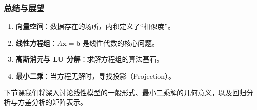 \begin{frame}
\frametitle{总结与展望}

\begin{enumerate}
    \item \textbf{向量空间}：数据存在的场所，内积定义了“相似度”。
    \item \textbf{线性方程组}：$A\mathbf{x}=\mathbf{b}$ 是线性代数的核心问题。
    \item \textbf{高斯消元与 LU 分解}：求解方程组的算法基石。
    \item \textbf{最小二乘}：当方程无解时，寻找投影（Projection）。
\end{enumerate}

\vspace{1em}
\begin{center}
    下节课我们将深入讨论线性模型的一般形式、最小二乘解的几何意义，以及回归分析与方差分析的矩阵表示。
\end{center}

\end{frame}



